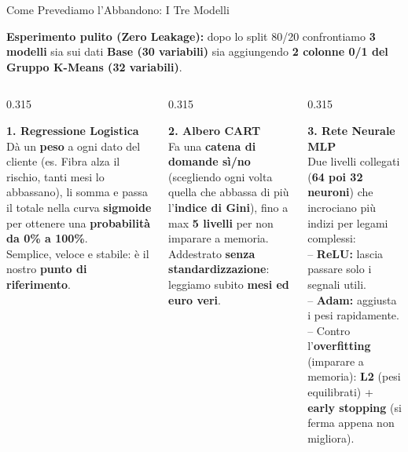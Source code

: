 \documentclass[aspectratio=169, 10pt]{beamer}
\newcommand{\card}[3]{%
    \colorbox{#1}{\parbox{\dimexpr#2-2\fboxsep\relax}{\raggedright #3}}%
}
\begin{document}
\begin{frame}{Come Prevediamo l'Abbandono: I Tre Modelli}
    \card{CardBlue}{\textwidth}{\footnotesize
        \textbf{\color{PrimaryNavy} Esperimento pulito (Zero Leakage):} dopo lo split 80/20 confrontiamo \textbf{3 modelli} sia sui dati \textbf{Base (30 variabili)} sia aggiungendo \textbf{2 colonne 0/1 del Gruppo K-Means (32 variabili)}.
    }

    \vspace{2.6mm}
    \begin{columns}[T, onlytextwidth]
        \begin{column}{0.315\textwidth}
            \card{CardBlue}{\linewidth}{\scriptsize
                \textbf{\color{PrimaryNavy}\small 1. Regressione Logistica}\\[3pt]
                Dà un \textbf{peso} a ogni dato del cliente (es. Fibra alza il rischio, tanti mesi lo abbassano), li somma e passa il totale nella curva \textbf{sigmoide} per ottenere una \textbf{probabilità da 0\% a 100\%}.\\[3pt]
                Semplice, veloce e stabile: è il nostro \textbf{punto di riferimento}.
            }
        \end{column}

        \begin{column}{0.315\textwidth}
            \card{CardGreen}{\linewidth}{\scriptsize
                \textbf{\color{AccentGreen}\small 2. Albero CART}\\[3pt]
                Fa una \textbf{catena di domande sì/no} (scegliendo ogni volta quella che abbassa di più l'\textbf{indice di Gini}), fino a max \textbf{5 livelli} per non imparare a memoria.\\[3pt]
                Addestrato \textbf{senza standardizzazione}: leggiamo subito \textbf{mesi ed euro veri}.
            }
        \end{column}

        \begin{column}{0.315\textwidth}
            \card{CardAmber}{\linewidth}{\scriptsize
                \textbf{\color{AccentAmber}\small 3. Rete Neurale MLP}\\[3pt]
                Due livelli collegati (\textbf{64 poi 32 neuroni}) che incrociano più indizi per legami complessi:\\[2pt]
                -- \textbf{ReLU:} lascia passare solo i segnali utili.\\
                -- \textbf{Adam:} aggiusta i pesi rapidamente.\\
                -- Contro l'\textbf{overfitting} (imparare a memoria): \textbf{L2} (pesi equilibrati) + \textbf{early stopping} (si ferma appena non migliora).
            }
        \end{column}
    \end{columns}


\end{frame}
\end{document}
